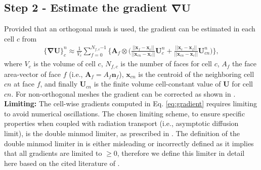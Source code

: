 \documentclass[10pt,letterpaper,notitlepage]{article}
\numberwithin{equation}{section}
\newcommand{\bnabla}{\boldsymbol{\nabla}}
\newcommand{\position}{\mathbf{x}}
\newcommand{\beqn}{\begin{equation}\begin{aligned}}
\newcommand{\eeqn}{\end{aligned}\end{equation}}
\begin{document}
\subsection{Step 2 - Estimate the gradient $\bnabla \mathbf{U}$}
Provided that an orthogonal mush is used, the gradient can be estimated in each cell $c$ from
\beqn \label{eq:gradient}
\big\{ \bnabla \mathbf{U} \big\}_c^n
\approx
\frac{1}{V_c}
\sum_{f=0}^{N_{f,c}{-1}}  
\biggr\{
\mathbf{A}_f \otimes
\biggr(
\frac{||\position_f - \position_c||}{||\position_{cn} - \position_c||} \mathbf{U}_c^n
+
\frac{||\position_c - \position_f||}{||\position_{cn} - \position_c||} \mathbf{U}_{cn}^n
\biggr)
\biggr\},
\eeqn 
where $V_c$ is the volume of cell $c$, $N_{f,c}$ is the number of faces for cell $c$, $A_f$ the face area-vector of face $f$ (i.e., $\mathbf{A}_f = A_f \mathbf{n}_f$), $\position_{cn}$ is the centroid of the neighboring cell $cn$ at face $f$, and finally $\mathbf{U}_{cn}$ is the finite volume cell-constant value of $\mathbf{U}$ for cell $cn$. For non-orthogonal meshes the gradient can be corrected as shown in \cite{Moukalled}.
\newline 
\newline
\textbf{Limiting:}\newline
The cell-wise gradients computed in Eq. \eqref{eq:gradient} requires limiting to avoid numerical oscillations. The chosen limiting scheme, to ensure specific properties when coupled with radiation transport (i.e., asymptotic diffusion limit), is the double minmod limiter, as prescribed in \cite{McClarrenSlopes}. The definition of the double minmod limiter in \cite{McClarrenSlopes} is either misleading or incorrectly defined as it implies that all gradients are limited to $\ge 0$, therefore we define this limiter in detail here based on the cited literature of \cite{McClarrenSlopes}.
\end{document}
